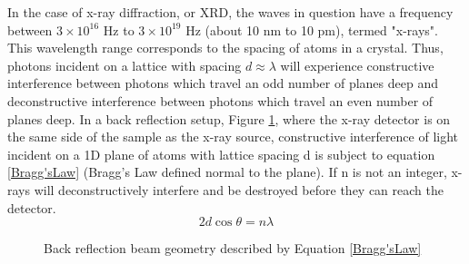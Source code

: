 In the case of x-ray diffraction, or XRD, the waves in question have a frequency between $3\times10^{16}$ Hz to $3\times10^{19}$ Hz (about 10 nm to 10 pm), termed "x-rays". This wavelength range corresponds to the spacing of atoms in a crystal. Thus, photons incident on a lattice with spacing $d\approx\lambda$ will experience constructive interference between photons which travel an odd number of planes deep and deconstructive interference between photons which travel an even number of planes deep. In a back reflection setup, Figure \ref{BackRef}, where the x-ray detector is on the same side of the sample as the x-ray source, constructive interference of light incident on a 1D plane of atoms with lattice spacing d is subject to equation \ref{Bragg'sLaw} (Bragg’s Law defined normal to the plane). If n is not an integer, x-rays will deconstructively interfere and be destroyed before they can reach the detector.
\begin{equation}
    2d\cos{\theta} = n\lambda
    \label{Bragg'sLaw}
\end{equation}

\begin{figure}[htbp]
  \centering
  
  \caption{Back reflection beam geometry described by Equation \ref{Bragg'sLaw}}
  \label{BackRef}
\end{figure}

